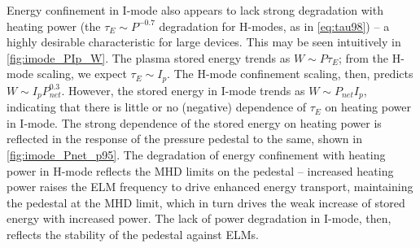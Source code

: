 \begin{figure}[p]
 \pushtooutside
\end{figure}

Energy confinement in I-mode also appears to lack strong degradation with heating power (\cf the $\tau_E \sim P^{-0.7}$ degradation for H-modes, as in \cref{eq:tau98}) -- a highly desirable characteristic for large devices.  This may be seen intuitively in \cref{fig:imode_PIp_W}.  The plasma stored energy trends as $W \sim P \tau_E$; from the H-mode scaling, we expect $\tau_E \sim I_p$.  The H-mode confinement scaling, then, predicts $W \sim I_p P_{net}^{0.3}$.  However, the stored energy in I-mode trends as $W \sim P_{net} I_p$, indicating that there is little or no (negative) dependence of $\tau_E$ on heating power in I-mode.  The strong dependence of the stored energy on heating power is reflected in the response of the pressure pedestal to the same, shown in \cref{fig:imode_Pnet_p95}.  The degradation of energy confinement with heating power in H-mode reflects the MHD limits on the pedestal -- increased heating power raises the ELM frequency to drive enhanced energy transport, maintaining the pedestal at the MHD limit, which in turn drives the weak increase of stored energy with increased power.  The lack of power degradation in I-mode, then, reflects the stability of the pedestal against ELMs.

